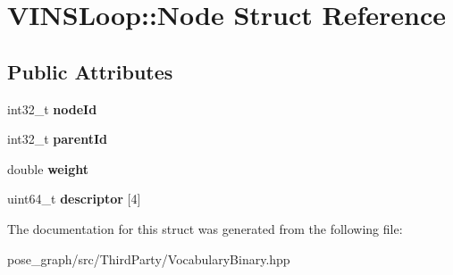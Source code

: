 \hypertarget{structVINSLoop_1_1Node}{}\section{V\+I\+N\+S\+Loop\+:\+:Node Struct Reference}
\label{structVINSLoop_1_1Node}
\subsection*{Public Attributes}
\begin{DoxyCompactItemize}
\item 
\mbox{\label{structVINSLoop_1_1Node_a7143f2166be29de8d9f1d64f11e98f03}} 
int32\+\_\+t {\bfseries node\+Id}
\item 
\mbox{\label{structVINSLoop_1_1Node_ad962c8ac9634bacd1f1b2c30b360ccb4}} 
int32\+\_\+t {\bfseries parent\+Id}
\item 
\mbox{\label{structVINSLoop_1_1Node_a9bf07e4605fe5246b6e91705b013c183}} 
double {\bfseries weight}
\item 
\mbox{\label{structVINSLoop_1_1Node_aa9d6c70b568c3d31b30b257cf757391d}} 
uint64\+\_\+t {\bfseries descriptor} \mbox{[}4\mbox{]}
\end{DoxyCompactItemize}


The documentation for this struct was generated from the following file\+:\begin{DoxyCompactItemize}
\item 
pose\+\_\+graph/src/\+Third\+Party/Vocabulary\+Binary.\+hpp\end{DoxyCompactItemize}
